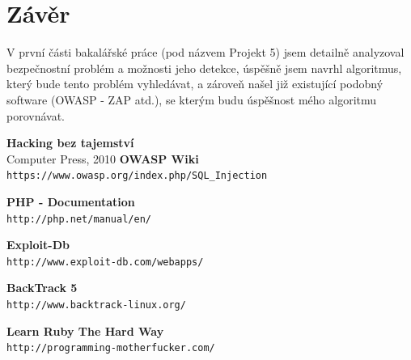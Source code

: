 \documentclass[12pt, a4paper]{report}
\begin{document}
\chapter{Závěr}
V první části bakalářské práce (pod názvem Projekt 5) jsem detailně analyzoval bezpečnostní problém a možnosti jeho detekce, úspěšně jsem navrhl algoritmus, který bude tento problém vyhledávat, a zároveň našel již existující podobný software (OWASP - ZAP  atd.), se kterým budu úspěšnost mého algoritmu porovnávat.

\begin{thebibliography}{9}
               {\bf Hacking bez tajemství} \\
           Computer Press, 2010
	{\bf OWASP Wiki} \\
	\texttt{https://www.owasp.org/index.php/SQL\_Injection}

	{\bf PHP - Documentation}\\
	\texttt{http://php.net/manual/en/}

	{\bf Exploit-Db}\\
	\texttt{http://www.exploit-db.com/webapps/}

 {\bf BackTrack 5}\\
	\texttt{http://www.backtrack-linux.org/}

 {\bf Learn Ruby The Hard Way}\\
	\texttt{http://programming-motherfucker.com/}

\end{thebibliography}
\end{document}
